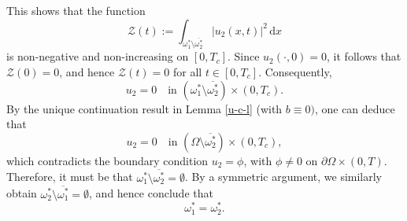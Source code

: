 \documentclass[a4paper,12pt,reqno,natbib]{amsart}
\newcommand{\dx} {\displaystyle\mathrm{d}x}
\begin{document}
This shows that the function
\[
\mathcal{Z}(t) := \int_{\omega_1^* \setminus \overline{\omega_2^*}} |u_2(x, t)|^2 \, \dx
\]
is non-negative and non-increasing on \( [0, T_c] \). Since \( u_2(\cdot,0) = 0 \), it follows that \( \mathcal{Z}(0) = 0 \), and hence \( \mathcal{Z}(t) = 0 \) for all \( t \in [0, T_c] \). Consequently,
\[
u_2 = 0 \quad \text{in } (\omega_1^* \setminus \overline{\omega_2^*}) \times (0, T_c).
\]
By the unique continuation result in Lemma \ref{u-c-l} (with $b\equiv0)$, one can deduce that
\[
u_2 = 0 \quad \text{in } (\Omega \setminus \overline{\omega_2^*}) \times (0, T_c),
\]
which contradicts the boundary condition \( u_2 = \phi \), with \( \phi \neq 0 \) on \( \partial \Omega \times (0, T) \). Therefore, it must be that \( \omega_1^* \setminus \overline{\omega_2^*} = \emptyset \). By a symmetric argument, we similarly obtain \( \omega_2^* \setminus \overline{\omega_1^*} = \emptyset \), and hence conclude that
\[
\omega_1^* = \omega_2^*.
\]

\medskip
\end{document}
